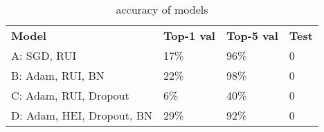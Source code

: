 

\begin{table}[htbp]
\begin{center}
\begin{tabular}{|l|l|l|l|}
\cline{1-4}
\textbf{Model} & \textbf{Top-1 val} & \textbf{Top-5 val} & \textbf{Test}  \\
\cline{1-4}
          A: SGD, RUI                &   17\%  		  &  96\%	      & 0\\
          B: Adam, RUI, BN           &   22\%  		  &  98\%	      & 0\\
          C: Adam, RUI, Dropout      &   6\%      	&  40\%       & 0\\
          D: Adam, HEI, Dropout, BN  &   29\%  	    &  92\% 	    &	0\\

\cline{1-4}
\end{tabular}
\caption[]
{\small
accuracy of models
}
\label{table:accuracy}
\end{center}
\end{table}
